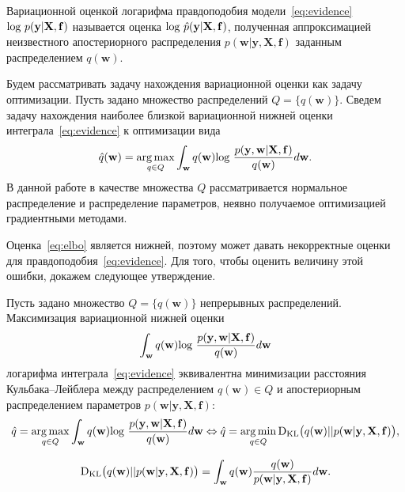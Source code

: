\documentclass[12pt]{a&t}
\DeclareMathOperator*{\argmax}{arg\,max}
\DeclareMathOperator*{\argmin}{arg\,min}
\begin{document}
{
\begin{definition} Вариационной оценкой логарифма правдоподобия модели~\eqref{eq:evidence} $\textnormal{log}~p(\mathbf{y}|\mathbf{X},\mathbf{f})$ называется оценка $\textnormal{log}~\hat{p}(\mathbf{y}|\mathbf{X},\mathbf{f})$, полученная аппроксимацией неизвестного апостериорного распределения $p(\mathbf{w}| \mathbf{y}, \mathbf{X}, \mathbf{f})$ заданным распределением $q(\mathbf{w})$.
\end{definition}
}


Будем рассматривать задачу нахождения вариационной оценки как задачу оптимизации. Пусть задано множество распределений $Q =\{q(\mathbf{w})\}$. Сведем задачу нахождения наиболее близкой вариационной нижней оценки интеграла~\eqref{eq:evidence} к оптимизации вида
\[
     \hat{q}(\mathbf{w}) = \argmax_{q \in Q}  \int_{\mathbf{w}} q(\mathbf{w})\textnormal{log}~\frac{p(\mathbf{y},\mathbf{w}|\mathbf{X},\mathbf{f})}{q(\mathbf{w})}d\mathbf{w}.
\]  
В данной работе в качестве множества $Q$ рассматривается нормальное распределение и распределение параметров, неявно получаемое оптимизацией градиентными методами. 

Оценка~\eqref{eq:elbo} является нижней, поэтому может давать некорректные оценки для правдоподобия~\eqref{eq:evidence}. Для того, чтобы оценить величину этой ошибки, докажем следующее утверждение.

\begin{statement}\label{st:st1} Пусть задано множество $Q = \{q(\mathbf{w})\}$ непрерывных распределений. Максимизация вариационной нижней оценки $$\int_{\mathbf{w}} q(\mathbf{w})\textnormal{log}~\frac{p(\mathbf{y},\mathbf{w}|\mathbf{X},\mathbf{f})}{q(\mathbf{w})}d\mathbf{w}$$  логарифма интеграла~\eqref{eq:evidence}  эквивалентна минимизации расстояния Кульбака--Лейблера между распределением $q(\mathbf{w}) \in Q$ и апостериорным распределением параметров $p(\mathbf{w}|\mathbf{y}, \mathbf{X}, \mathbf{f})$:
\begin{equation}
\label{eq:optim}
    \hat{q} = \argmax_{q \in Q} \int_{\mathbf{w}} q(\mathbf{w})\textnormal{log}~\frac{p(\mathbf{y},\mathbf{w}|\mathbf{X},\mathbf{f})}{q(\mathbf{w})}d\mathbf{w} \Leftrightarrow 	
    \hat{q} = \argmin_{q \in Q} \textnormal{D}_\textnormal{KL}  \bigl(q(\mathbf{w})||p(\mathbf{w}|\mathbf{y}, \mathbf{X}, \mathbf{f})\bigr),
\end{equation}

\[
	\textnormal{D}_\textnormal{KL}  \bigl(q(\mathbf{w})||p(\mathbf{w}|\mathbf{y}, \mathbf{X}, \mathbf{f})\bigr) =  \int_\mathbf{w} q(\mathbf{w}) \frac{q(\mathbf{w})}{p(\mathbf{w}|\mathbf{y}, \mathbf{X}, \mathbf{f})} d\mathbf{w}.
\]

\end{statement}
\end{document}

